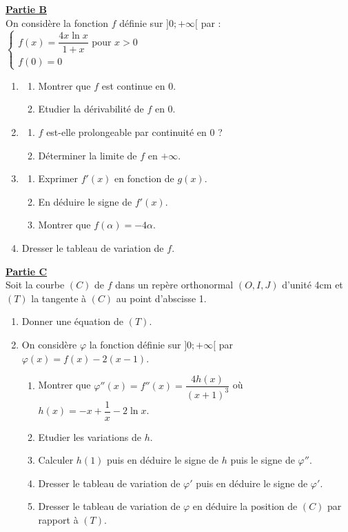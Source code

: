 \documentclass[12pt,a4paper]{article}
\begin{document}
\noindent \underline{\textbf{Partie B}} \\
On considère la fonction $f$ définie sur $]0; +\infty[$ par :
$\begin{cases} f(x) = \dfrac{4x\ln x}{1+x} \text{ pour } x > 0 \\ f(0) = 0 \end{cases}$
\begin{enumerate}
    \item \begin{enumerate}
        \item Montrer que $f$ est continue en 0.
        \item Etudier la dérivabilité de $f$ en 0.
    \end{enumerate}
    \item \begin{enumerate}
        \item $f$ est-elle prolongeable par continuité en 0 ?
        \item Déterminer la limite de $f$ en $+\infty$.
    \end{enumerate}
    \item \begin{enumerate}
        \item Exprimer $f'(x)$ en fonction de $g(x)$.
        \item En déduire le signe de $f'(x)$.
        \item Montrer que $f(\alpha) = -4\alpha$.
    \end{enumerate}
    \item Dresser le tableau de variation de $f$.
\end{enumerate}

\vspace{0.5cm}

\noindent \underline{\textbf{Partie C}} \\
Soit la courbe $(C)$ de $f$ dans un repère orthonormal $(O, I, J)$ d'unité 4cm et $(T)$ la tangente à $(C)$ au point d'abscisse 1.
\begin{enumerate}
    \item Donner une équation de $(T)$.
    \item On considère $\varphi$ la fonction définie sur $]0; +\infty[$ par $\varphi(x) = f(x) - 2(x - 1)$.
    \begin{enumerate}
        \item Montrer que $\varphi''(x) = f''(x) = \dfrac{4h(x)}{(x+1)^3}$ où $h(x) = -x + \dfrac{1}{x} - 2\ln x$.
        \item Etudier les variations de $h$.
        \item Calculer $h(1)$ puis en déduire le signe de $h$ puis le signe de $\varphi''$.
        \item Dresser le tableau de variation de $\varphi'$ puis en déduire le signe de $\varphi'$.
        \item Dresser le tableau de variation de $\varphi$ en déduire la position de $(C)$ par rapport à $(T)$.
    \end{enumerate}
\end{enumerate}
\end{document}
